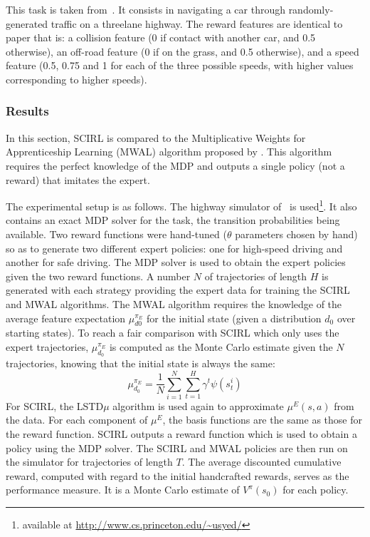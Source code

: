 \documentclass[tablecaption=bottom]{jmlr}
\begin{document}
This task is taken from~\cite{syed2008game}. It consists in
navigating a car through randomly-generated traffic on a threelane
highway. The reward features are identical to~\citet{syed2008game}
paper that is: a collision feature (0 if contact with another car,
and 0.5 otherwise), an off-road feature (0 if on the grass, and 0.5
otherwise), and a speed feature (0.5, 0.75 and 1 for each of the
three possible speeds, with higher values corresponding to higher
speeds).

\subsubsection{Results}

In this section, SCIRL is compared to the Multiplicative Weights for
Apprenticeship Learning (MWAL) algorithm proposed by
\citet{syed2008game}. This algorithm requires the perfect knowledge
of the MDP and outputs a single policy (not a reward) that imitates
the expert.

The experimental setup is as follows. The highway simulator
of~\cite{syed2008game} is used\footnote{available at \url{
http://www.cs.princeton.edu/~usyed/}}. It also contains an exact MDP
solver for the task, the transition probabilities being available.
Two reward functions were hand-tuned ($\theta$ parameters chosen by
hand) so as to generate two different expert policies: one for
high-speed driving and another for safe driving. The MDP solver is
used to obtain the expert policies given the two reward functions. A
number $N$ of trajectories of length $H$ is generated with each
strategy providing the expert data for training the SCIRL and MWAL
algorithms. The MWAL algorithm requires the knowledge of the average
feature expectation $\mu_{d0}^{\pi_E}$ for the initial state (given
a distribution $d_0$ over starting states). To reach a fair
comparison with SCIRL which only uses the expert trajectories,
$\mu_{d_0}^{\pi_E}$ is computed as the Monte Carlo estimate given
the $N$ trajectories, knowing that the initial state is always the
same:
%
$$\mu_{d_0}^{\pi_E} = \frac{1}{N}\sum_{i=1}^N \sum_{t=1}^H \gamma^t \psi(s_t^i)$$
%
For SCIRL, the LSTD$\mu$ algorithm is used again to approximate
$\mu^E(s,a)$ from the data. For each component of $\mu^E$, the basis
functions are the same as those for the reward function. SCIRL
outputs a reward function which is used to obtain a policy using the
MDP solver. The SCIRL and MWAL policies are then run on the
simulator for trajectories of length $T$. The average discounted
cumulative reward, computed with regard to the initial handcrafted
rewards, serves as the performance measure. It is a Monte Carlo
estimate of $V^\pi(s_0)$ for each policy.
\end{document}
